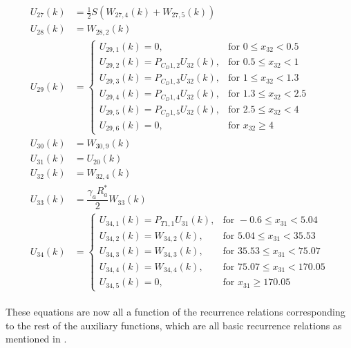 \begin{align} \label{eq:allRecRel3}
\begin{split}
U_{27} \left(k\right)&= \frac{1}{2}S\left(W_{27,4}\left(k\right)+ W_{27,5}\left(k\right)\right) \\
U_{28} \left(k\right)&= W_{28,2}\left(k\right) \\
U_{29} \left(k\right)&=\begin{cases}
U_{29,1}\left(k\right)=0, & \text{for } 0\leq x_{32} < 0.5\\
U_{29,2}\left(k\right)=P_{C_{D} 1,2}U_{32}\left(k\right), &  \text{for } 0.5\leq x_{32} < 1 \\
U_{29,3}\left(k\right)=P_{C_{D} 1,3}U_{32}\left(k\right), &  \text{for } 1\leq x_{32} < 1.3 \\
U_{29,4}\left(k\right)=P_{C_{D} 1,4}U_{32}\left(k\right), &  \text{for } 1.3\leq x_{32} < 2.5 \\
U_{29,5}\left(k\right)=P_{C_{D} 1,5}U_{32}\left(k\right), &  \text{for } 2.5\leq x_{32} < 4 \\
U_{29,6}\left(k\right)=0, &  \text{for } x_{32} \geq 4 
\end{cases}\\
U_{30} \left(k\right)&=W_{30,9}\left(k\right) \\
U_{31} \left(k\right)&= U_{20}\left(k\right)\\
U_{32} \left(k\right)&= W_{32,4}\left(k\right)\\
U_{33} \left(k\right)&= \dfrac{\gamma_{a}R_{a}^{*}}{2}W_{33}\left(k\right) \\
U_{34}\left(k\right)&=\begin{cases}
U_{34,1}\left(k\right)=P_{T 1,1}U_{31}\left(k\right), & \text{for } -0.6 \leq x_{31} < 5.04  \\
U_{34,2}\left(k\right)=W_{34,2}\left(k\right), &  \text{for } 5.04\leq x_{31} < 35.53   \\
U_{34,3}\left(k\right)=W_{34,3}\left(k\right), &  \text{for } 35.53\leq x_{31} < 75.07   \\
U_{34,4}\left(k\right)=W_{34,4}\left(k\right), &  \text{for } 75.07\leq x_{31} < 170.05   \\
U_{34,5}\left(k\right)=0, &  \text{for }  x_{31} \geq 170.05   
\end{cases}
\end{split}
\end{align}

These equations are now all a function of the recurrence relations corresponding to the rest of the auxiliary functions, which are all basic recurrence relations as mentioned in . \\

